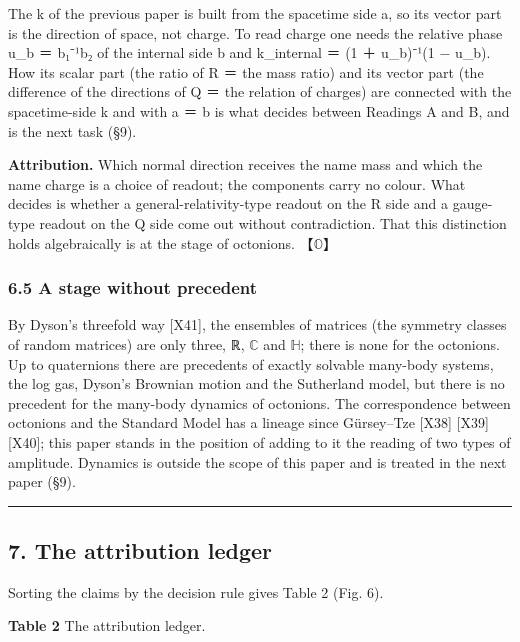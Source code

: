 \documentclass[
  a4paper,
]{article}
\newcounter{none} %
\begin{document}
The k of the previous paper is built from the spacetime side a, so its
vector part is the direction of space, not charge. To read charge one
needs the relative phase u\_b ＝ b₁⁻¹b₂ of the internal side b and
k\_internal ＝ (1 ＋ u\_b)⁻¹(1 − u\_b). How its scalar part (the ratio
of R ＝ the mass ratio) and its vector part (the difference of the
directions of Q ＝ the relation of charges) are connected with the
spacetime-side k and with \textbar a\textbar{} ＝ \textbar b\textbar{}
is what decides between Readings A and B, and is the next task (§9).

\textbf{Attribution.} Which normal direction receives the name mass and
which the name charge is a choice of readout; the components carry no
colour. What decides is whether a general-relativity-type readout on the
R side and a gauge-type readout on the Q side come out without
contradiction. That this distinction holds algebraically is at the stage
of octonions. 【\(\mathbb{O}\)】

\subsubsection{6.5 A stage without
precedent}\label{a-stage-without-precedent}

By Dyson's threefold way {[}X41{]}, the ensembles of matrices (the
symmetry classes of random matrices) are only three, ℝ, \(\mathbb{C}\)
and \(\mathbb{H}\); there is none for the octonions. Up to quaternions
there are precedents of exactly solvable many-body systems, the log gas,
Dyson's Brownian motion and the Sutherland model, but there is no
precedent for the many-body dynamics of octonions. The correspondence
between octonions and the Standard Model has a lineage since Gürsey--Tze
{[}X38{]} {[}X39{]} {[}X40{]}; this paper stands in the position of
adding to it the reading of two types of amplitude. Dynamics is outside
the scope of this paper and is treated in the next paper (§9).

\begin{center}\rule{0.5\linewidth}{0.5pt}\end{center}

\subsection{7. The attribution ledger}\label{the-attribution-ledger}

Sorting the claims by the decision rule gives Table 2 (Fig. 6).

\textbf{Table 2} The attribution ledger.
\end{document}
